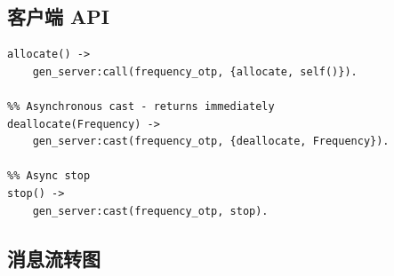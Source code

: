 \documentclass[a4paper,11pt]{article}
\begin{document}
\subsection{客户端 API}

\begin{lstlisting}[style=erlangstyle, caption={客户端 API --- call 与 cast}]
%% Synchronous call - waits for server reply
allocate() ->
    gen_server:call(frequency_otp, {allocate, self()}).

%% Asynchronous cast - returns immediately
deallocate(Frequency) ->
    gen_server:cast(frequency_otp, {deallocate, Frequency}).

%% Async stop
stop() ->
    gen_server:cast(frequency_otp, stop).
\end{lstlisting}

\subsection{消息流转图}
\end{document}
